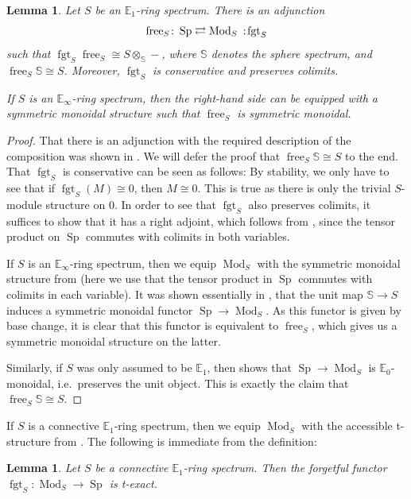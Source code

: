 \documentclass{article}
\theoremstyle{definition}
\theoremstyle{definition}
\theoremstyle{definition}
\theoremstyle{plain}
\newtheorem{lem}[defn]{Lemma}
\theoremstyle{plain}
\theoremstyle{plain}
\theoremstyle{plain}
\theoremstyle{plain}
\theoremstyle{plain}
\theoremstyle{plain}
\theoremstyle{plain}
\theoremstyle{remark}
\theoremstyle{remark}
\theoremstyle{plain}
\theoremstyle{plain}
\theoremstyle{plain}
\theoremstyle{plain}
\theoremstyle{plain}
\newcommand{\Mod}[1]{\operatorname{Mod}_{#1}}
\newcommand{\Sp}{\operatorname{Sp}}
\renewcommand{\S}{\mathbb{S}}
\newcommand{\fgt}[1]{\operatorname{fgt}_{#1}}
\newcommand{\free}[1]{\operatorname{free}_{#1}}
\newcommand\noloc{%
  \nobreak
  \mspace{6mu plus 1mu}
  {:}
  \nonscript\mkern-\thinmuskip
  \mathpunct{}
  \mspace{2mu}
}
\begin{document}
\begin{lem} \label{lem:affine:free-forget}
    Let $S$ be an $\mathbb{E}_1$-ring spectrum.
    There is an adjunction
    \begin{equation*}
        \free{S} \colon \Sp \rightleftarrows \Mod{S} \noloc \fgt{S}
    \end{equation*}
    such that $\fgt{S}\free{S} \cong S \otimes_{\S} -$,
    where $\S$ denotes the sphere spectrum,
    and $\free{S} \S \cong S$.
    Moreover, $\fgt{S}$ is conservative and preserves colimits.

    If $S$ is an $\mathbb{E}_\infty$-ring spectrum,
    then the right-hand side can be equipped with a symmetric monoidal 
    structure such that $\free{S}$ is symmetric monoidal.
\end{lem}
\begin{proof}
    That there is an adjunction with the required description 
    of the composition was shown in \cite[Corollary 4.2.4.8]{higheralgebra}.
    We will defer the proof that $\free{S} \S \cong S$ to the end.
    That $\fgt{S}$ is conservative can be seen as follows: By stability,
    we only have to see that if $\fgt{S}(M) \cong 0$, then $M \cong 0$.
    This is true as there is only the trivial $S$-module structure on $0$.
    In order to see that $\fgt{S}$ also preserves colimits,
    it suffices to show that it has a right adjoint,
    which follows from \cite[Remark 4.2.3.8]{higheralgebra},
    since the tensor product on $\Sp$ commutes with colimits in both variables.

    If $S$ is an $\mathbb{E}_\infty$-ring spectrum,
    then we equip $\Mod{S}$ with the symmetric monoidal structure
    from \cite[Theorem 4.5.2.1]{higheralgebra} (here we use that 
    the tensor product in $\Sp$ commutes with colimits in each variable).
    It was shown essentially in \cite[Corollary 5.1.2.6]{higheralgebra},
    that the unit map $\S \to S$ induces a symmetric monoidal functor 
    $\Sp \to \Mod{S}$. As this functor is given by base change, it is clear that this functor 
    is equivalent to $\free{S}$, which gives us a symmetric monoidal structure on the latter.

    Similarly, if $S$ was only assumed to be $\mathbb{E}_1$,
    then \cite[Corollary 5.1.2.6]{higheralgebra} shows that $\Sp \to \Mod{S}$
    is $\mathbb{E}_0$-monoidal, i.e.\ preserves the unit object.
    This is exactly the claim that $\free{S} \S \cong S$.
\end{proof}

If $S$ is a connective $\mathbb{E}_1$-ring spectrum,
then we equip $\Mod{S}$ with the accessible t-structure from \cite[Proposition 7.1.1.13]{higheralgebra}.
The following is immediate from the definition:
\begin{lem} \label{lem:affine:forget-t-exact}
    Let $S$ be a connective $\mathbb{E}_1$-ring spectrum.
    Then the forgetful functor $\fgt{S} \colon \Mod{S} \to \Sp$
    is t-exact.
\end{lem}
 
\end{document}
